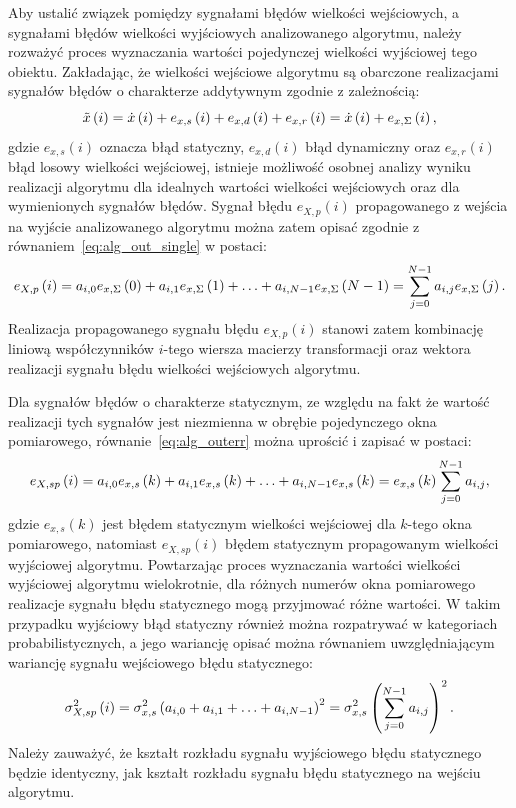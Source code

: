Aby ustalić związek pomiędzy sygnałami błędów wielkości wejściowych, a sygnałami błędów wielkości wyjściowych analizowanego algorytmu, należy rozważyć proces wyznaczania wartości pojedynczej wielkości wyjściowej tego obiektu. Zakładając, że wielkości wejściowe algorytmu są obarczone realizacjami sygnałów błędów o charakterze addytywnym zgodnie z zależnością:
\begin{equation}
\tilde{x} \left(i\right) = \dot{x} \left(i\right) + e_{x,s} \left(i\right) + e_{x,d} \left(i\right) + e_{x,r} \left(i\right) = \dot{x} \left(i\right) + e_{x,\Sigma} \left(i\right) \label{eq:alg_inputval},
\end{equation}
gdzie $e_{x,s}(i)$ oznacza błąd statyczny, $e_{x,d}(i)$ błąd dynamiczny oraz $e_{x,r}(i)$ błąd losowy wielkości wejściowej, istnieje możliwość osobnej analizy wyniku realizacji algorytmu dla idealnych wartości wielkości wejściowych oraz dla wymienionych sygnałów błędów. Sygnał błędu $e_{X,p}(i)$ propagowanego z wejścia na wyjście analizowanego algorytmu można zatem opisać zgodnie z równaniem~\eqref{eq:alg_out_single} w postaci:
\begin{equation}
e_{X,p} \left(i\right) = a_{i, 0} e_{x,\Sigma} \left(0\right) + a_{i, 1} e_{x,\Sigma} \left(1\right) + \hdots + a_{i, N-1} e_{x,\Sigma} \left(N-1\right) = \sum _{j = 0} ^{N-1} a_{i,j} e_{x,\Sigma} \left(j\right) \label{eq:alg_outerr}.
\end{equation}
Realizacja propagowanego sygnału błędu $e_{X,p}(i)$ stanowi zatem kombinację liniową współczynników $i$-tego wiersza macierzy transformacji oraz wektora realizacji sygnału błędu wielkości wejściowych algorytmu.

Dla sygnałów błędów o charakterze statycznym, ze względu na fakt że wartość realizacji tych sygnałów jest niezmienna w obrębie pojedynczego okna pomiarowego, równanie~\eqref{eq:alg_outerr} można uprościć i zapisać w postaci:
\begin{equation}
e_{X,sp} \left(i\right) = a_{i, 0} e_{x,s} \left(k\right) + a_{i, 1} e_{x,s} \left(k\right) + \hdots + a_{i, N-1} e_{x,s} \left(k\right) = e_{x,s} \left(k\right) \sum _{j = 0} ^{N-1} a_{i, j} \label{eq:alg_outerr_stat},
\end{equation}
gdzie $e_{x,s}(k)$ jest błędem statycznym wielkości wejściowej dla $k$-tego okna pomiarowego, natomiast $e_{X,sp}(i)$ błędem statycznym propagowanym wielkości wyjściowej algorytmu. Powtarzając proces wyznaczania wartości wielkości wyjściowej algorytmu wielokrotnie, dla różnych numerów okna pomiarowego realizacje sygnału błędu statycznego mogą przyjmować różne wartości. W takim przypadku wyjściowy błąd statyczny również można rozpatrywać w kategoriach probabilistycznych, a jego wariancję opisać można równaniem uwzględniającym wariancję sygnału wejściowego błędu statycznego:
\begin{equation}
\sigma_{X,sp}^{2} \left(i\right) = \sigma_{x,s}^{2} \left( a_{i, 0} + a_{i, 1} + \hdots + a_{i, N-1} \right)^{2} = \sigma_{x,s}^{2} \left( \sum _{j = 0} ^{N-1} a_{i, j} \right)^{2} \label{eq:alg_outvar_stat}.
\end{equation}
Należy zauważyć, że kształt rozkładu sygnału wyjściowego błędu statycznego będzie identyczny, jak kształt rozkładu sygnału błędu statycznego na wejściu algorytmu.

